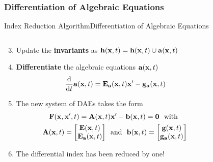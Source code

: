 \subsubsection{Differentiation of Algebraic Equations}

\begin{frame}{Index Reduction Algorithm}{Differentiation of Algebraic Equations}
  \vspace{-1.5em}
  \begin{columns}
    \begin{column}[c]{0.6\textwidth}
      \begin{enumerate}[<+->]\setcounter{enumi}{2}
        \item Update the \textbf{invariants} as $\mathbf{h}(\mathbf{x}, t) = \mathbf{h}(\mathbf{x}, t) \cup \mathbf{a}(\mathbf{x}, t)$
        \item \textbf{Differentiate} the algebraic equations $\mathbf{a}(\mathbf{x}, t)$
        \begin{equation*}
          \dfrac{\text{d}}{\text{d}t} \mathbf{a}(\mathbf{x}, t) = \mathbf{E}_{\mathbf{a}}(\mathbf{x}, t) \mathbf{x}^\prime - \mathbf{g}_{\mathbf{a}}(\mathbf{x}, t)
        \end{equation*}
        \item The new system of \acsp{DAE} takes the form
        \begin{align*}
          \mathbf{F}(\mathbf{x}, \mathbf{x}^\prime, t) = \mathbf{A}(\mathbf{x}, t) &\mathbf{x}^\prime - \mathbf{b}(\mathbf{x}, t) = \mathbf{0} ~~ \text{with} \\
          \mathbf{A}(\mathbf{x}, t) = \begin{bmatrix} \mathbf{E}(\mathbf{x}, t) \\ \mathbf{E}_{\mathbf{a}}(\mathbf{x}, t) \end{bmatrix}
          ~~ &\text{and} ~~
          \mathbf{b}(\mathbf{x}, t) = \begin{bmatrix} \mathbf{g}(\mathbf{x}, t) \\ \mathbf{g}_{\mathbf{a}}(\mathbf{x}, t) \end{bmatrix}
        \end{align*}
        \item The differential index has been reduced by one!
      \end{enumerate}
    \end{column}
    \begin{column}[c]{0.4\textwidth}
    \end{column}
  \end{columns}
\end{frame}

